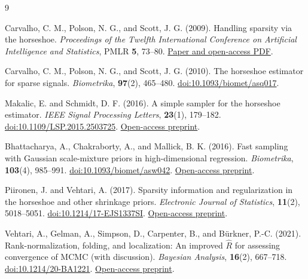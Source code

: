 \documentclass[11pt,letterpaper]{article}
\numberwithin{equation}{section}
\begin{document}
\clearpage
{}
{}
\begin{thebibliography}{9}
\raggedright
{}
Carvalho, C. M., Polson, N. G., and Scott, J. G. (2009).
Handling sparsity via the horseshoe.
\emph{Proceedings of the Twelfth International Conference on Artificial
Intelligence and Statistics}, PMLR \textbf{5}, 73--80.
\href{https://proceedings.mlr.press/v5/carvalho09a.html}{Paper and open-access PDF}.

Carvalho, C. M., Polson, N. G., and Scott, J. G. (2010).
The horseshoe estimator for sparse signals.
\emph{Biometrika}, \textbf{97}(2), 465--480.
\href{https://doi.org/10.1093/biomet/asq017}{doi:10.1093/biomet/asq017}.

Makalic, E. and Schmidt, D. F. (2016).
A simple sampler for the horseshoe estimator.
\emph{IEEE Signal Processing Letters}, \textbf{23}(1), 179--182.
\href{https://doi.org/10.1109/LSP.2015.2503725}{doi:10.1109/LSP.2015.2503725}.
\href{https://arxiv.org/abs/1508.03884}{Open-access preprint}.

Bhattacharya, A., Chakraborty, A., and Mallick, B. K. (2016).
Fast sampling with Gaussian scale-mixture priors in high-dimensional regression.
\emph{Biometrika}, \textbf{103}(4), 985--991.
\href{https://doi.org/10.1093/biomet/asw042}{doi:10.1093/biomet/asw042}.
\href{https://arxiv.org/abs/1506.04778}{Open-access preprint}.

Piironen, J. and Vehtari, A. (2017).
Sparsity information and regularization in the horseshoe and other shrinkage priors.
\emph{Electronic Journal of Statistics}, \textbf{11}(2), 5018--5051.
\href{https://doi.org/10.1214/17-EJS1337SI}{doi:10.1214/17-EJS1337SI}.
\href{https://arxiv.org/abs/1707.01694}{Open-access preprint}.

Vehtari, A., Gelman, A., Simpson, D., Carpenter, B., and B\"urkner, P.-C. (2021).
Rank-normalization, folding, and localization: An improved
\(\widehat R\) for assessing convergence of MCMC (with discussion).
\emph{Bayesian Analysis}, \textbf{16}(2), 667--718.
\href{https://doi.org/10.1214/20-BA1221}{doi:10.1214/20-BA1221}.
\href{https://arxiv.org/abs/1903.08008}{Open-access preprint}.
\end{thebibliography}
\end{document}
